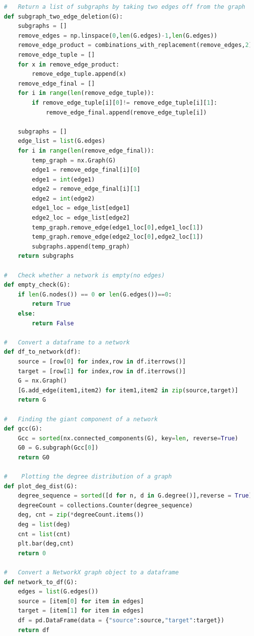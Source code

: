 \documentclass[12pt]{article}
\begin{document}
\begin{lstlisting}[language=Python,breaklines=true]
#   Return a list of subgraphs by taking two edges off from the graph
def subgraph_two_edge_deletion(G):
    subgraphs = []
    remove_edges = np.linspace(0,len(G.edges)-1,len(G.edges))
    remove_edge_product = combinations_with_replacement(remove_edges,2)
    remove_edge_tuple = []
    for x in remove_edge_product:
        remove_edge_tuple.append(x)
    remove_edge_final = []
    for i in range(len(remove_edge_tuple)):
        if remove_edge_tuple[i][0]!= remove_edge_tuple[i][1]:
            remove_edge_final.append(remove_edge_tuple[i])
    
    subgraphs = []
    edge_list = list(G.edges)
    for i in range(len(remove_edge_final)):
        temp_graph = nx.Graph(G)
        edge1 = remove_edge_final[i][0]
        edge1 = int(edge1)
        edge2 = remove_edge_final[i][1]
        edge2 = int(edge2)
        edge1_loc = edge_list[edge1]
        edge2_loc = edge_list[edge2]
        temp_graph.remove_edge(edge1_loc[0],edge1_loc[1])
        temp_graph.remove_edge(edge2_loc[0],edge2_loc[1])
        subgraphs.append(temp_graph)
    return subgraphs

#   Check whether a network is empty(no edges)
def empty_check(G):
    if len(G.nodes()) == 0 or len(G.edges())==0:
        return True
    else:
        return False

#   Convert a dataframe to a network
def df_to_network(df):
    source = [row[0] for index,row in df.iterrows()]
    target = [row[1] for index,row in df.iterrows()]
    G = nx.Graph()
    [G.add_edge(item1,item2) for item1,item2 in zip(source,target)]
    return G

#   Finding the giant component of a network
def gcc(G):
    Gcc = sorted(nx.connected_components(G), key=len, reverse=True)
    G0 = G.subgraph(Gcc[0])
    return G0

#    Plotting the degree distribution of a graph
def plot_deg_dist(G):
    degree_sequence = sorted([d for n, d in G.degree()],reverse = True)
    degreeCount = collections.Counter(degree_sequence)
    deg, cnt = zip(*degreeCount.items())
    deg = list(deg)
    cnt = list(cnt)
    plt.bar(deg,cnt)
    return 0

#   Convert a NetworkX graph object to a dataframe
def network_to_df(G):
    edges = list(G.edges())
    source = [item[0] for item in edges]
    target = [item[1] for item in edges]
    df = pd.DataFrame(data = {"source":source,"target":target})
    return df


\end{lstlisting}
\end{document}
